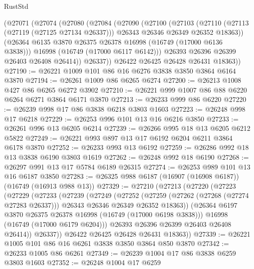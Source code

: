 \begin{lexlean}{RustStd}
\begin{coremodule}
      (@27071
        (@27074
          (@27080
            (@27084
              (@27090
                (@27100
                  (@27103
                    (@27110
                      (@27113 (@27119 (@27125 @27134 @26337)))
                      @26343
                      @26346
                      @26349
                      @26352
                      @18363))
                  (@26364 @6135 @3870 @26375 @26378 @16998 (@16749 (@17000 @6136 @3838)))
                  @16998
                  (@16749 (@17000 @6117 @6142)))
                @26393
                @26396
                @26399
                @26403
                @26408
                @26414))
            @26337))
        @26422
        @26425
        @26428
        @26431
        @18363))
@27190 := @26221 @1009 @101 @86 @16 @6276 @3838 @3850 @3864 @6164 @3870
@27194 := @26261 @1009 @86 @6265 @6274
@27200 := @26213 @1008 @427 @86 @6265 @6272 @3902
@27210 := @26221 @999 @1007 @86 @88 @6220 @6264 @6271 @3864 @6171 @3870
@27213 := @26233 @999 @86 @6220
@27220 := @26239 @998 @17 @86 @3838 @6218 @3803 @1603
@27223 := @26248 @998 @17 @6218
@27229 := @26253 @996 @101 @13 @16 @6216 @3850
@27233 := @26261 @996 @13 @6205 @6214
@27239 := @26266 @995 @18 @13 @6205 @6212 @5822
@27249 := @26221 @993 @897 @13 @17 @6192 @6204 @6211 @3864 @6178 @3870
@27252 := @26233 @993 @13 @6192
@27259 := @26286 @992 @18 @13 @3838 @6190 @3803 @1619
@27262 := @26248 @992 @18 @6190
@27268 := @26297 @991 @13 @17 @5784 @6189 @26315
@27274 := @26253 @989 @101 @13 @16 @6187 @3850
@27283 := @26325 @988 @6187 (@16907 (@16908 @6187)) (@16749 (@16913 @988 @13))
@27329 := @27210
    (@27213
      (@27220
        (@27223
          (@27229
            (@27233
              (@27239
                (@27249
                  (@27252
                    (@27259
                      (@27262 (@27268 (@27274 @27283 @26337)))
                      @26343
                      @26346
                      @26349
                      @26352
                      @18363))
                  (@26364 @6197 @3870 @26375 @26378 @16998 (@16749 (@17000 @6198 @3838)))
                  @16998
                  (@16749 (@17000 @6179 @6204)))
                @26393
                @26396
                @26399
                @26403
                @26408
                @26414))
            @26337))
        @26422
        @26425
        @26428
        @26431
        @18363))
@27339 := @26221 @1005 @101 @86 @16 @6261 @3838 @3850 @3864 @850 @3870
@27342 := @26233 @1005 @86 @6261
@27349 := @26239 @1004 @17 @86 @3838 @6259 @3803 @1603
@27352 := @26248 @1004 @17 @6259

\end{coremodule}
\end{lexlean}
